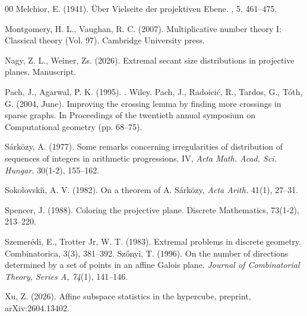 \documentclass[10pt]{article}
\theoremstyle{definition}
\begin{document}
\begin{thebibliography}{00}
		Melchior, E. (1941).
		\newblock \"Uber Vielseite der projektiven Ebene.
		, 5, 461--475.
		
		 Montgomery, H. L.,  Vaughan, R. C. (2007). Multiplicative number theory I: Classical theory (Vol. 97). Cambridge University press.
		
		
		 Nagy, Z. L., Weiner, Zs. (2026). Extremal secant size distributions in projective planes. Manuscript.
		
		Pach, J.,  Agarwal, P. K. (1995).
		.
		\newblock Wiley.
		 Pach, J., Radoici\'c, R., Tardos, G., Tóth, G. (2004, June). Improving the crossing lemma by finding more crossings in sparse graphs. In Proceedings of the twentieth annual symposium on Computational geometry (pp. 68--75).
		
		
		S\'{a}rk\"{o}zy, A. (1977). Some remarks concerning irregularities of distribution of sequences of integers in arithmetic progressions. {IV}, \textit{Acta Math. Acad. Sci. Hungar.} {30}(1-2), 155--162.
		
		Sokolovski\u{\i}, A. V. (1982). On a theorem of {A}. {S}\'{a}rk\"{o}zy, \textit{Acta Arith.} {41}(1), 27--31.
		
		 Spencer, J. (1988). Coloring the projective plane. Discrete Mathematics, 73(1-2), 213--220.
		
		
		Szemerédi, E.,  Trotter Jr, W. T. (1983). Extremal problems in discrete geometry. Combinatorica, 3(3), 381--392.
		Szőnyi, T. (1996). On the number of directions determined by a set of points in an affine Galois plane. \textit{Journal of Combinatorial Theory, Series A, 74}(1), 141–146.
		
		Xu, Z. (2026).
		\newblock Affine subspace statistics in the hypercube,
		\newblock preprint, arXiv:2604.13402.
		
		
		
		
		
	\end{thebibliography}
	
\end{document}
